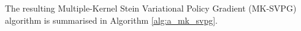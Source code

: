 The resulting Multiple-Kernel Stein Variational Policy Gradient (MK-SVPG) algorithm is summarised in Algorithm \ref{alg:a_mk_svpg}. 



